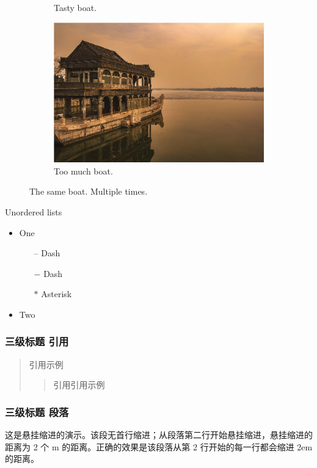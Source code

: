 \documentclass[a4paper,11pt,onecolumn]{article}
\begin{document}
\begin{enumerate}
\begin{figure}[hbtp]
\begin{subfigure}[b]{0.2\linewidth}
      \caption{Tasty boat.}
    \end{subfigure}
    \begin{subfigure}[b]{0.5\linewidth}
      \includegraphics[width=\linewidth]{materials/boat.png}
      \caption{Too much boat.}
    \end{subfigure}
    \caption{The same boat. Multiple times.}
  \end{figure}
\end{enumerate}

Unordered lists
\begin{itemize}[label=$\ast$]
  \item One
    \begin{itemize}
      \item[--] Dash
      \item[$-$] Dash
      \item[$\ast$] Asterisk
    \end{itemize}
  \item Two
\end{itemize}
\subsubsection{三级标题 引用}
\begin{quote}
引用示例
  \begin{quote}
  引用引用示例
  \end{quote}
\end{quote}
\subsubsection{三级标题 段落}
\setlength{\hangindent}{2em} %
\noindent
这是悬挂缩进的演示。该段无首行缩进；从段落第二行开始悬挂缩进，悬挂缩进的距离为 2 个
m 的距离。正确的效果是该段落从第 2 行开始的每一行都会缩进 2em 的距离。
\end{document}
